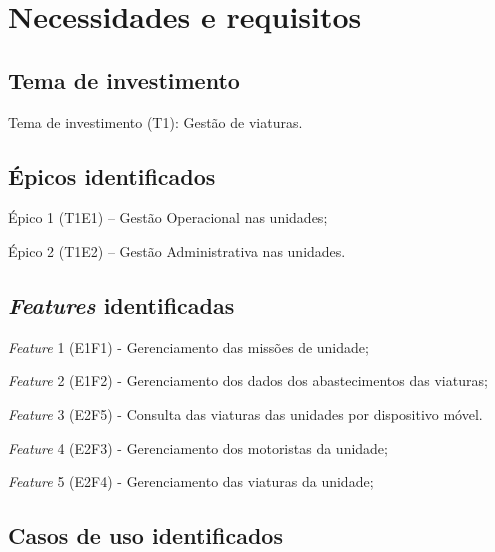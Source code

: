 \chapter{Necessidades e requisitos}
  
  \section{Tema de investimento}
  
  Tema de investimento (T1): Gestão de viaturas.
  
  \section{Épicos identificados}
    
  Épico 1 (T1E1) – Gestão Operacional nas unidades;
  
  Épico 2 (T1E2) – Gestão Administrativa nas unidades.
  
  \section{\textit{Features} identificadas}
  
  \textit{Feature} 1 (E1F1) - Gerenciamento das missões de unidade;
  
  \textit{Feature} 2 (E1F2) - Gerenciamento dos dados dos abastecimentos das viaturas;
  
   \textit{Feature} 3 (E2F5) - Consulta das viaturas das unidades por dispositivo móvel. 
  
  \textit{Feature} 4 (E2F3) - Gerenciamento dos motoristas da unidade;
  
  \textit{Feature} 5 (E2F4) - Gerenciamento das viaturas da unidade;
  
 
  
  \section{Casos de uso identificados} 
    

